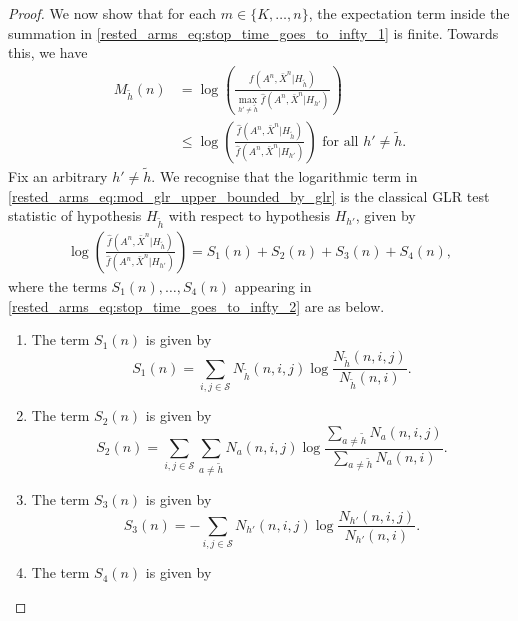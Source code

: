 \begin{proof}
We now show that for each $m\in\{K,\ldots,n\}$, the expectation term inside the summation in \eqref{rested_arms_eq:stop_time_goes_to_infty_1} is finite. Towards this, we have
\begingroup\allowdisplaybreaks\begin{align}
	M_{\tilde{h}}(n)&=\log\left(\frac{f(A^n,\bar{X}^n|H_{\tilde{h}})}{\max\limits_{h'\neq \tilde{h}}\hat{f}(A^n,\bar{X}^n|H_{h'})}\right)\nonumber\\
	&\leq \log\left(\frac{\hat{f}(A^n,\bar{X}^n|H_{\tilde{h}})}{\hat{f}(A^n,\bar{X}^n|H_{h'})}\right)\text{ for all }h'\neq \tilde{h}.\label{rested_arms_eq:mod_glr_upper_bounded_by_glr}
\end{align}\endgroup
Fix an arbitrary $h'\neq \tilde{h}$. We recognise that the logarithmic term in \eqref{rested_arms_eq:mod_glr_upper_bounded_by_glr} is the classical GLR test statistic of hypothesis $H_{\tilde{h}}$ with respect to hypothesis $H_{h'}$, given by
\begingroup\allowdisplaybreaks\begin{align}
	\log\left(\frac{\hat{f}(A^n,\bar{X}^n|H_{\tilde{h}})}{\hat{f}(A^n,\bar{X}^n|H_{h'})}\right)=S_1(n)+S_2(n)+S_3(n)+S_4(n),\label{rested_arms_eq:stop_time_goes_to_infty_2}
\end{align}\endgroup
where the terms $S_1(n),\ldots,S_4(n)$ appearing in \eqref{rested_arms_eq:stop_time_goes_to_infty_2} are as below.
\begin{enumerate}
	\item The term $S_1(n)$ is given by
	\begin{equation}
		S_1(n)=\sum\limits_{i,j\in\mathcal{S}}N_{\tilde{h}}(n,i,j)\log\frac{N_{\tilde{h}}(n,i,j)}{N_{\tilde{h}}(n,i)}.\label{rested_arms_eq:S_1(n)}
	\end{equation}
	\item The term $S_2(n)$ is given by
    \begin{equation}
		S_2(n)=\sum\limits_{i,j\in\mathcal{S}}\sum\limits_{a\neq \tilde{h}}N_a(n,i,j)\log\frac{\sum\limits_{a\neq \tilde{h}}N_a(n,i,j)}{\sum\limits_{a\neq \tilde{h}}N_a(n,i)}.\label{rested_arms_eq:S_2(n)}
		\end{equation}
	\item The term $S_3(n)$ is given by
    \begin{equation}
		S_3(n)=-\sum\limits_{i,j\in\mathcal{S}}N_{h'}(n,i,j)\log\frac{N_{h'}(n,i,j)}{N_{h'}(n,i)}.\label{rested_arms_eq:S_3(n)}
	\end{equation}
	\item The term $S_4(n)$ is given by
    \begin{equation}

\end{equation}
\end{enumerate}
\end{proof}
